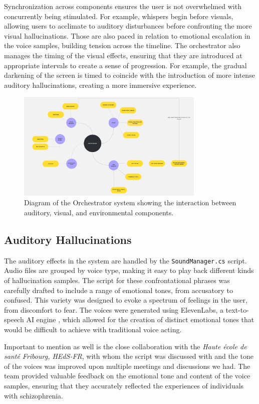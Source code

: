 Synchronization across components ensures the user is not overwhelmed with concurrently being stimulated. For example, whispers begin before visuals, allowing users to acclimate to auditory disturbances before confronting the more visual hallucinations. Those are also paced in relation to emotional escalation in the voice samples, building tension across the timeline.
The orchestrator also manages the timing of the visual effects, ensuring that they are introduced at appropriate intervals to create a sense of progression. For example, the gradual darkening of the screen is timed to coincide with the introduction of more intense auditory hallucinations, creating a more immersive experience.
\begin{figure}[h!]
    \centering
    \includegraphics[width=0.8\textwidth]{../../Figures/Orch-sequence.png}
    \caption{Diagram of the Orchestrator system showing the interaction between auditory, visual, and environmental components.}
    \label{fig:orchestrator}
\end{figure}


\subsection{Auditory Hallucinations}
The auditory effects in the system are handled by the \texttt{SoundManager.cs} script. Audio files are grouped by voice type, making it easy to play back different kinds of hallucination samples. The script for these confrontational phrases was carefully drafted to include a range of emotional tones, from accusatory to confused. This variety was designed to evoke a spectrum of feelings in the user, from discomfort to fear. The voices were generated using ElevenLabs, a text-to-speech AI engine \cite{elevenlabs}, which allowed for the creation of distinct emotional tones that would be difficult to achieve with traditional voice acting.

Important to mention as well is the close collaboration with the \textit{Haute école de santé Fribourg, HEdS-FR}, with whom the script was discussed with and the tone of the voices was improved upon multiple meetings and discussions we had. The team provided valuable feedback on the emotional tone and content of the voice samples, ensuring that they accurately reflected the experiences of individuals with schizophrenia.

